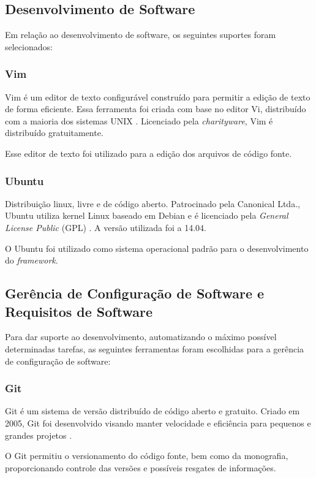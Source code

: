 \begin{apendicesenv}
\subsection{Desenvolvimento de Software}
Em relação ao desenvolvimento de software, os seguintes suportes foram selecionados:

\subsubsection{Vim}
Vim é um editor de texto configurável construído para permitir a edição de texto de forma eficiente. Essa ferramenta foi criada com base no editor Vi, distribuído com a maioria dos sistemas UNIX \cite{vim}. Licenciado pela \textit{charityware}, Vim é distribuído gratuitamente. 
\par
\indent Esse editor de texto foi utilizado para a edição dos arquivos de código fonte.

\subsubsection{Ubuntu}
Distribuição linux, livre e de código aberto. Patrocinado pela Canonical Ltda., Ubuntu utiliza kernel Linux baseado em Debian e é licenciado pela \textit{General License Public} (GPL) \cite{ubuntu2010}. A versão utilizada foi a 14.04.
\par
\indent O Ubuntu foi utilizado como sistema operacional padrão para o desenvolvimento do \textit{framework}.

\subsection{Gerência de Configuração de Software e Requisitos de Software}
Para dar suporte ao desenvolvimento, automatizando o máximo possível determinadas tarefas, as seguintes ferramentas foram escolhidas para a gerência de configuração de software:

\subsubsection{Git}
Git é um sistema de versão distribuído de código aberto e gratuito. Criado em 2005, Git foi desenvolvido visando manter velocidade e eficiência para pequenos e grandes projetos \cite{git2015}. 
\par
\indent O Git permitiu o versionamento do código fonte, bem como da monografia, proporcionando controle das versões e possíveis resgates de informações.


\end{apendicesenv}
